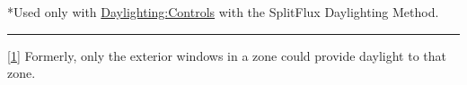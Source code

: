*Used only with \hyperref[daylightingcontrols-000]{Daylighting:Controls} with the SplitFlux Daylighting Method.

\begin{center}\rule{0.5\linewidth}{0.4pt}\end{center}

\protect\hyperlink{ux5fftnref1}{{[}1{]}} Formerly, only the exterior windows in a zone could provide daylight to that zone.
